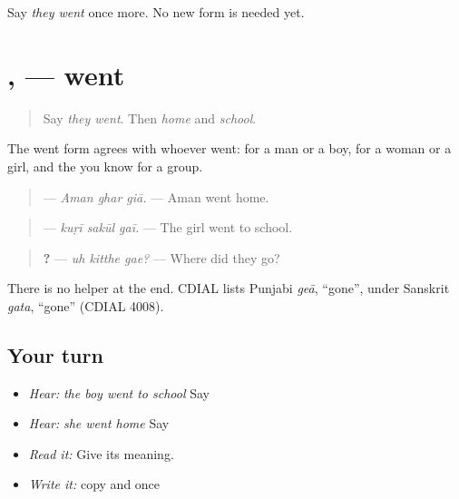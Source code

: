 \begin{tcolorbox}[breakable,colback=teal!4,colframe=teal!35!black,title={Before you move on}]
Say \emph{they went} once more. No new form is needed yet.
\end{tcolorbox}
\section[\texorpdfstring{\pa{ਗਿਆ} · \pa{ਗਈ} (giā · gaī)}{ਗਿਆ · ਗਈ (giā · gaī)}]{,  — went}

\label{lesson:PA-C216-gia-gai}



\begin{quote}
Say \emph{they went}. Then \emph{home} and \emph{school}.
\end{quote}

\begin{grammarlens}[title={Grammar Lens: one went for each}]
The went form agrees with whoever went: \textbf{} for a man or a boy, \textbf{} for a woman or a girl, and the \textbf{} you know for a group.

\begin{quote}
\textbf{  } — \emph{Aman ghar giā.} — Aman went home.
\end{quote}

\begin{quote}
\textbf{  } — \emph{kuṛī sakūl gaī.} — The girl went to school.
\end{quote}

\begin{quote}
\textbf{  ?} — \emph{uh kitthe gae?} — Where did they go?
\end{quote}

There is no helper at the end. CDIAL lists Punjabi \emph{geā}, \textquotedblleft{}gone\textquotedblright{}, under Sanskrit \emph{gata}, \textquotedblleft{}gone\textquotedblright{} (CDIAL 4008).
\end{grammarlens}

\subsection*{Your turn}
\begin{itemize}
\raggedright
  \item \emph{Hear:} \emph{the boy went to school} Say \textbf{  }
  \item \emph{Hear:} \emph{she went home} Say \textbf{  }
  \item \emph{Read it:} \textbf{  } Give its meaning.
  \item \emph{Write it:} copy \textbf{} and \textbf{} once
\end{itemize}

